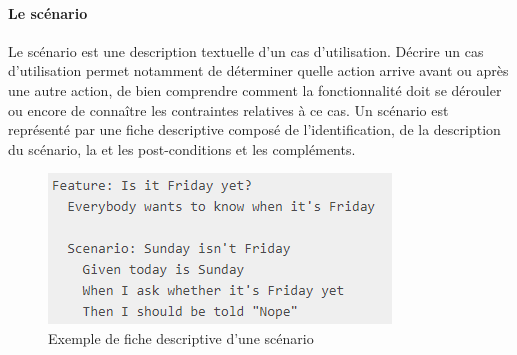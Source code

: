        \paragraph{Le scénario}

        Le scénario est une description textuelle d'un cas d'utilisation. Décrire un cas d'utilisation permet notamment de déterminer quelle action arrive avant ou après une autre action, de bien comprendre comment la fonctionnalité doit se dérouler ou encore de connaître les contraintes relatives à ce cas. Un scénario est représenté par une fiche descriptive composé de l'identification, de la description du scénario, la et les post-conditions et les compléments. 
        \begin{figure}[H]
            \centering
            \includegraphics[width=\textwidth]{scenar.png}
            \caption{Exemple de fiche descriptive d'une scénario}
        \end{figure}
        
